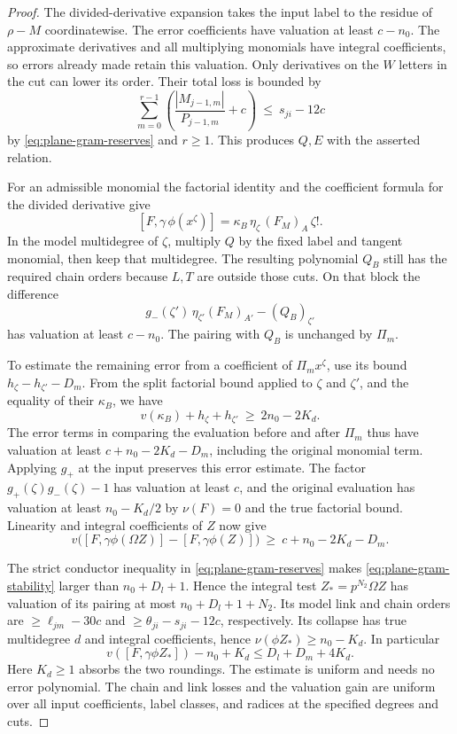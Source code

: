 \begin{proof}
The divided-derivative expansion takes the input label to the residue of \(\rho-M\)
coordinatewise. The error coefficients have valuation at
least \(c-n_0\). The approximate derivatives and all
multiplying monomials have integral coefficients, so errors
already made retain this valuation. Only derivatives on
the \(W\) letters in the cut can lower its order. Their
total loss is bounded by
\[
    \sum_{m=0}^{r-1}
       \left(\frac{|M_{j-1,m}|}{P_{j-1,m}}+c\right)
    \ \le\ s_{ji}-12c
\]
by \eqref{eq:plane-gram-reserves} and \(r\ge1\).
This produces \(Q,E\) with the asserted relation.

For an admissible monomial the factorial identity and the
coefficient formula for the divided derivative give
\[
 [F,\gamma\,\phi(x^\zeta)]
       = \kappa_B\,\eta_\zeta\, (F_M)_A\,\zeta! .
\]
In the model multidegree of \(\zeta\), multiply \(Q\) by
the fixed label and tangent monomial, then keep that
multidegree. The resulting polynomial \(Q_B\) still has
the required chain orders because \(L,T\) are outside
those cuts. On that block the difference
\[
    g_-(\zeta')\,\eta_{\zeta'}(F_M)_{A'}-(Q_B)_{\zeta'}
\]
has valuation at least \(c-n_0\). The pairing with
\(Q_B\) is unchanged by \(\Pi_m\).

To estimate the remaining
error from a coefficient of \(\Pi_m x^\zeta\), use its bound
\(h_\zeta-h_{\zeta'}-D_m\). From the split factorial
bound applied to \(\zeta\) and \(\zeta'\), and the equality
of their \(\kappa_B\), we have
\[
 v(\kappa_B)+h_\zeta+h_{\zeta'}\ \ge\ 2n_0-2K_d .
\]
The error terms in comparing the evaluation before and
after \(\Pi_m\) thus have valuation at least
\(c+n_0-2K_d-D_m\), including the original monomial term.
Applying \(g_+\) at the input preserves this error estimate.
The factor \(g_+(\zeta)g_-(\zeta)-1\) has valuation at least
\(c\), and the original evaluation has valuation at least
\(n_0-K_d/2\) by \(\nu(F)=0\) and the true factorial bound.
Linearity and integral coefficients of \(Z\) now give
\begin{equation}\label{eq:plane-gram-stability}
 v\bigl([F,\gamma\phi(\Omega Z)]-[F,\gamma\phi(Z)]\bigr)
               \ \ge\ c+n_0-2K_d-D_m .
\end{equation}

The strict conductor inequality in \eqref{eq:plane-gram-reserves}
makes \eqref{eq:plane-gram-stability} larger than
\(n_0+D_l+1\). Hence the integral test
\(Z_*=p^{N_2}\Omega Z\) has valuation of its pairing at
most \(n_0+D_l+1+N_2\). Its model link and chain orders are
\(\ge\ell_{jm}-30c\) and \(\ge\theta_{ji}-s_{ji}-12c\),
respectively. Its collapse has true multidegree \(d\) and
integral coefficients, hence \(\nu(\phi Z_*)\ge n_0-K_d\).
In particular
\[
 v([F,\gamma\phi Z_*])-n_0+K_d
                 \le D_l+D_m+4K_d .
\]
Here \(K_d\ge1\) absorbs the two roundings. The estimate is uniform and needs no error polynomial.
The chain and link losses and the valuation gain are
uniform over all input coefficients, label classes, and
radices at the specified degrees and cuts.
\end{proof}
